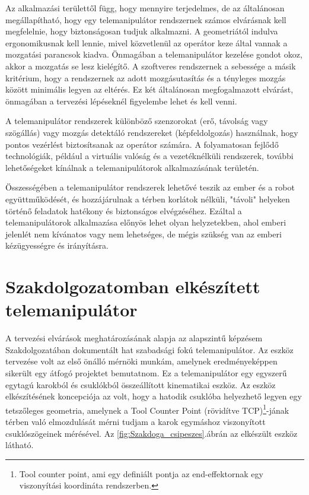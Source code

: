 Az alkalmazási területtől függ, hogy mennyire terjedelmes, de az általánosan megállapítható, hogy egy telemanipulátor rendszernek számos elvárásnak kell megfelelnie, hogy biztonságosan tudjuk alkalmazni. A geometriától indulva ergonomikusnak kell lennie, mivel közvetlenül az operátor keze által vannak a mozgatási parancsok kiadva. Önmagában a telemanipulátor kezelése gondot okoz, akkor a mozgatás se lesz kielégítő. A szoftveres rendszernek a sebessége a másik kritérium, hogy a rendszernek az adott mozgásutasítás és a tényleges mozgás között minimális legyen az eltérés. Ez két általánosan megfogalmazott elvárást, önmagában a tervezési lépéseknél figyelembe lehet és kell venni.

A telemanipulátor rendszerek különböző szenzorokat (erő, távolság vagy szögállás) vagy mozgás detektáló rendszereket (képfeldolgozás) használnak, hogy pontos vezérlést biztosítsanak az operátor számára. A folyamatosan fejlődő technológiák, például a virtuális valóság és a vezetéknélküli rendszerek, további lehetőségeket kínálnak a telemanipulátorok alkalmazásának területén.

Összességében a telemanipulátor rendszerek lehetővé teszik az ember és a robot együttműködését, és hozzájárulnak a térben korlátok nélküli, "távoli" helyeken történő feladatok hatékony és biztonságos elvégzéséhez. Ezáltal a telemanipulátorok alkalmazása előnyös lehet olyan helyzetekben, ahol emberi jelenlét nem kívánatos vagy nem lehetséges, de mégis szükség van az emberi kézügyességre és irányításra.

\section{Szakdolgozatomban elkészített telemanipulátor}

A tervezési elvárások meghatározásának alapja az alapszintű képzésem Szakdolgozatában dokumentált hat szabadsági fokú telemanipulátor. Az eszköz tervezése volt az első önálló mérnöki munkám, amelynek eredményeképpen sikerült egy átfogó projektet bemutatnom. Ez a telemanipulátor egy egyszerű egytagú karokból és csuklókból összeállított kinematikai eszköz. Az eszköz elkészítésének koncepciója az volt, hogy a hatodik csuklóba helyezhető legyen egy tetszőleges geometria, amelynek a Tool Counter Point (rövidítve TCP)\footnote{Tool counter point, ami egy definiált pontja az end-effektornak egy viszonyítási koordináta rendszerben.}-jának térben való elmozdulását mérni tudjam a karok egymáshoz viszonyított csuklószögeinek mérésével. Az \ref{fig:Szakdoga_csipeszes}.ábrán az elkészült eszköz látható.

